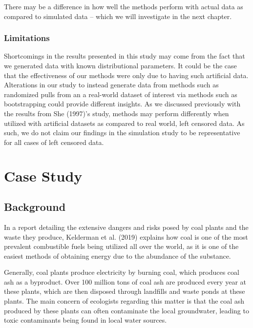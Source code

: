 \documentclass[12pt, twoside]{amherstthesis}
\begin{document}
There may be a difference in how well the methods perform with actual data as compared to simulated data -- which we will investigate in the next chapter.

\hypertarget{limitations}{%
\subsection{Limitations}\label{limitations}}

Shortcomings in the results presented in this study may come from the fact that we generated data with known distributional parameters. It could be the case that the effectiveness of our methods were only due to having such artificial data. Alterations in our study to instead generate data from methods such as randomized pulls from an a real-world dataset of interest via methods such as bootstrapping could provide different insights. As we discussed previously with the results from She (1997)'s study, methods may perform differently when utilized with artificial datasets as compared to real world, left censored data. As such, we do not claim our findings in the simulation study to be representative for all cases of left censored data.

\hypertarget{casestudy}{%
\chapter{Case Study}\label{casestudy}}

\hypertarget{background}{%
\section{Background}\label{background}}

In a report detailing the extensive dangers and risks posed by coal plants and the waste they produce, Kelderman et al. (2019) explains how coal is one of the most prevalent combustible fuels being utilized all over the world, as it is one of the easiest methods of obtaining energy due to the abundance of the substance.

Generally, coal plants produce electricity by burning coal, which produces coal ash as a byproduct. Over 100 million tons of coal ash are produced every year at these plants, which are then disposed through landfills and waste ponds at these plants. The main concern of ecologists regarding this matter is that the coal ash produced by these plants can often contaminate the local groundwater, leading to toxic contaminants being found in local water sources.
\end{document}
